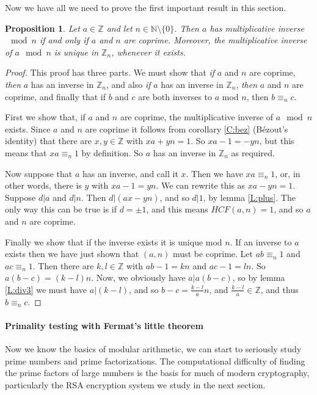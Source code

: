 \documentclass{article}
\theoremstyle{plain}
\newtheorem{proposition}[theorem]{Proposition}{\bfseries}{\itshape}
\newcommand{\bN}{\mathbb{N}}
\newcommand{\bZ}{\mathbb{Z}}
\begin{document}
Now we have all we need to prove the first important result in this section.

\begin{proposition}\label{P:inv}
Let $a\in \bZ$ and let $n\in\bN\setminus\{0\}$. Then $a$ has multiplicative inverse $\mod n$ if and only if $a$ and $n$ are coprime. Moreover, the multiplicative inverse of $a\mod n$ is unique in $\bZ_n$, whenever it exists. 
\end{proposition}
\begin{proof}
This proof has three parts. We must show that \emph{if} $a$ and $n$ are coprime, \emph{then} $a$ has an inverse in $\bZ_n$, and also \emph{if} $a$ has an inverse in $\bZ_n$, \emph{then} $a$ and $n$ are coprime, and finally that if $b$ and $c$ are both inverses to $a$ mod $n$, then $b\equiv_n c$.

First we show that, if $a$ and $n$ are coprime, the multiplicative inverse of $a \mod n$ exists. Since $a$ and $n$ are coprime it follows from corollary \ref{C:bez} (B\'ezout's identity) that there are $x,y\in\bZ$ with $xa + yn = 1$. So $xa-1 = -yn$, but this means that $xa \equiv_n 1$ by definition. So $a$ has an inverse in $\bZ_n$ as required.

Now suppose that $a$ has an inverse, and call it $x$. Then we have $xa \equiv_n 1$, or, in other words, there is $y$ with $xa - 1 = yn$. We can rewrite this as $xa - yn = 1$. Suppose $d|a$ and $d|n$. Then $d|(ax-yn)$, and so $d|1$, by lemma \ref{L:plus}. The only way this can be true is if $d=\pm 1$, and this means $HCF(a,n)=1$, and so $a$ and $n$ are coprime.

Finally we show that if the inverse exists it is unique mod $n$. If an inverse to $a$ exists then we have just shown that $(a,n)$ must be coprime. Let $ab\equiv_n 1$ and $ac\equiv_n 1$. Then there are $k,l\in\bZ$ with $ab - 1 = k n$ and $ac - 1 = ln$. So $a(b-c) = (k-l)n$. Now, we obviously have $a|a(b-c)$, so by lemma \ref{L:div3} we must have $a|(k-l)$, and so $b-c = \frac{k-l}{a}n$, and $\frac{k-l}{a}\in\bZ$, and thus $b\equiv_n c$. 
\end{proof}

\paragraph{Primality testing with Fermat's little theorem}
Now we know the basics of modular arithmetic, we can start to seriously study prime numbers and prime factorizations. The computational difficulty of finding the prime factors of large numbers is the basis for much of modern cryptography, particularly the RSA encryption system we study in the next section. 
\end{document}
